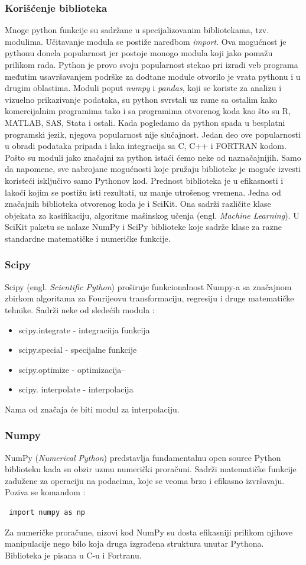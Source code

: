 \documentclass[12pt]{article}
\begin{document}
 \subsubsection{Korišćenje biblioteka}
Mnoge python funkcije su sadržane u specijalizovanim bibliotekama, tzv. modulima. Učitavanje modula se postiže naredbom \textsl{import}. Ova mogućnost je pythonu donela popularnost jer postoje monogo modula koji jako pomažu prilikom rada. Python je provo svoju popularnost stekao pri izradi veb programa međutim usavršavanjem podrške za dodtane module otvorilo je vrata pythonu i u drugim oblastima. Moduli poput \textsl{numpy} i \textsl{pandas}, koji se koriste za analizu i vizuelno prikazivanje podataka, su python svrstali uz rame sa ostalim kako komercijalnim programima tako i sa programima otvorenog koda kao što su R, MATLAB, SAS, Stata i ostali. Kada pogledamo da python spada u besplatni programski jezik, njegova popularnost nije slučajnost. Jedan deo ove popularnosti u obradi podataka pripada i laka integracija sa C, C++ i FORTRAN kodom.  
Pošto su moduli jako značajni za python istaći ćemo neke od naznačajnijih. Samo da napomene, sve nabrojane mogućnosti koje pružaju biblioteke je moguće izvesti koristeći isključivo samo Pythonov kod. Prednost biblioteka je u efikasnosti i lakoći kojim se postižu isti rezultati, uz manje utrošenog vremena. Jedna od značajnih biblioteka otvorenog koda je i SciKit. Ona sadrži različite klase objekata za kasifikaciju, algoritme mašinskog učenja (engl. \textsl{Machine Learning}).  U SciKit paketu se nalaze  NumPy i SciPy biblioteke koje sadrže klase za razne standardne matematičke i numeričke funkcije. 
\subsubsection{Scipy}
 Scipy (engl. \textsl{Scientific Python}) proširuje funkcionalnost Numpy-a sa značajnom zbirkom algoritama za Fourijeovu transformaciju, regresiju i druge matematičke tehnike.  Sadrži neke od sledećih modula :
 \begin{itemize}
 \item scipy.integrate - integraciija funkcija
 \item scipy.special - specijalne funkcije
\item scipy.optimize - optimizacija--
\item scipy. interpolate - interpolacija

\end{itemize}
Nama od značaja će biti modul za interpolaciju.
\subsubsection{Numpy}
NumPy (\textsl{Numerical Python}) predstavlja fundamentalnu open source Python biblioteku kada su obzir uzmu numerički proračuni. Sadrži matematičke funkcije zadužene za operaciju na podacima, koje se veoma brzo i efikasno izvršavaju. Poziva se komandom : 
\begin{lstlisting}
 import numpy as np
\end{lstlisting}
Za numeričke proračune, nizovi kod NumPy su dosta efikasniji prilikom njihove manipulacije nego bilo koja druga izgrađena struktura unutar Pythona.  Biblioteka je pisana u C-u i Fortranu. 
\end{document}
